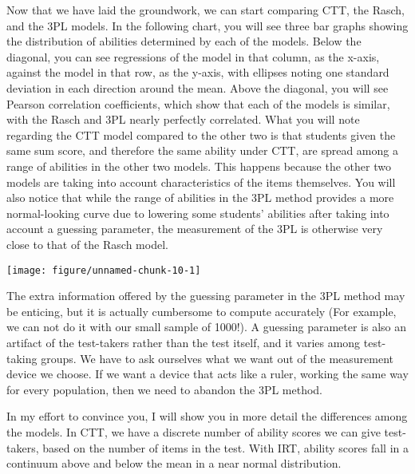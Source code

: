\documentclass{article}\usepackage[]{graphicx}\usepackage[]{color}
\makeatletter
\newenvironment{kframe}{%
 \def\at@end@of@kframe{}%
 \ifinner\ifhmode%
  \def\at@end@of@kframe{\end{minipage}}%
  \begin{minipage}{\columnwidth}%
 \fi\fi%
 \def\FrameCommand##1{\hskip\@totalleftmargin \hskip-\fboxsep
 \colorbox{shadecolor}{##1}\hskip-\fboxsep
     \hskip-\linewidth \hskip-\@totalleftmargin \hskip\columnwidth}%
 \MakeFramed {\advance\hsize-\width
   \@totalleftmargin\z@ \linewidth\hsize
   \@setminipage}}%
 {\par\unskip\endMakeFramed%
 \at@end@of@kframe}
\newenvironment{knitrout}{}{} %
\makeatother
\begin{document}
\begin{enumerate}
Now that we have laid the groundwork, we can start comparing CTT, the Rasch, and the 3PL models. In the following chart, you will see three bar graphs showing the distribution of abilities determined by each of the models. Below the diagonal, you can see regressions of the model in that column, as the x-axis, against the model in that row, as the y-axis, with ellipses noting one standard deviation in each direction around the mean. Above the diagonal, you will see Pearson correlation coefficients, which show that each of the models is similar, with the Rasch and 3PL nearly perfectly correlated. What you will note regarding the CTT model compared to the other two is that students given the same sum score, and therefore the same ability under CTT, are spread among a range of abilities in the other two models. This happens because the other two models are taking into account characteristics of the items themselves. You will also notice that while the range of abilities in the 3PL method provides a more normal-looking curve due to lowering some students' abilities after taking into account a guessing parameter, the measurement of the 3PL is otherwise very close to that of the Rasch model.

\centering
\begin{knitrout}
\color{fgcolor}\begin{kframe}


{\ttfamily\noindent\itshape\color{messagecolor}{\#\# EM cycles terminated after 500 iterations.}}\end{kframe}

{\centering \texttt{[image: figure/unnamed-chunk-10-1]} 

}



\end{knitrout}
\raggedright
The extra information offered by the guessing parameter in the 3PL method may be enticing, but it is actually cumbersome to compute accurately (For example, we can not do it with our small sample of 1000!). A guessing parameter is also an artifact of the test-takers rather than the test itself, and it varies among test-taking groups. We have to ask ourselves what we want out of the measurement device we choose. If we want a device that acts like a ruler, working the same way for every population, then we need to abandon the 3PL method.
\raggedright

In my effort to convince you, I will show you in more detail the differences among the models. 
In CTT, we have a discrete number of ability scores we can give test-takers, based on the number of items in the test. With IRT, ability scores fall in a continuum above and below the mean in a near normal distribution.


\end{enumerate}
\end{document}
